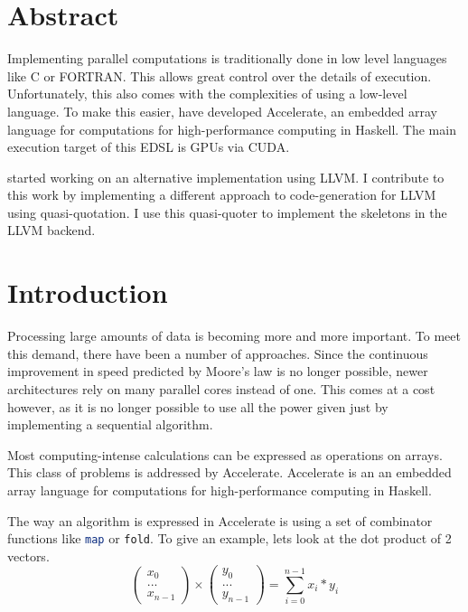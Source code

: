 \documentclass[a4paper,bibliography=totocnumbered,parskip,headsepline]{scrbook}
\begin{document}
\chapter*{Abstract}
Implementing parallel computations is traditionally done in low level languages like C or FORTRAN.
This allows great control over the details of execution.
Unfortunately, this also comes with the complexities of using a low-level language.
To make this easier, \citeauthor{chakravarty2011accelerating} have developed Accelerate, an embedded array language for computations for high-performance computing in Haskell.
The main execution target of this EDSL is GPUs via CUDA.

\citeauthor{trevor2014llvm} started working on an alternative implementation using LLVM.
I contribute to this work by implementing a different approach to code-generation for LLVM using quasi-quotation.
I use this quasi-quoter to implement the skeletons in the LLVM backend.

\listoftodos
\tableofcontents   %
\listoffigures     %
\listoftables      %
\mainmatter

\chapter{Introduction}
Processing large amounts of data is becoming more and more important.
To meet this demand, there have been a number of approaches.
Since the continuous improvement in speed predicted by Moore's law is no longer possible, newer architectures rely on many parallel cores instead of one.
This comes at a cost however, as it is no longer possible to use all the power given just by implementing a sequential algorithm.

Most computing-intense calculations can be expressed as operations on arrays.
This class of problems is addressed by Accelerate\cite{chakravarty2011accelerating,mcdonelloptimising}.
Accelerate is an an embedded array language for computations for high-performance computing in Haskell.

The way an algorithm is expressed in Accelerate is using a set of combinator functions like \lstinline[language=haskell]!map! or \lstinline[language=haskell]!fold!.
To give an example, lets look at the dot product of 2 vectors.
\[
\begin{pmatrix}
x_0 \\ ... \\ x_{n-1}
\end{pmatrix}
\times
\begin{pmatrix}
y_0 \\ ... \\ y_{n-1}
\end{pmatrix}
= \displaystyle\sum_{i=0}^{n-1} x_i*y_i
\]
\end{document}
